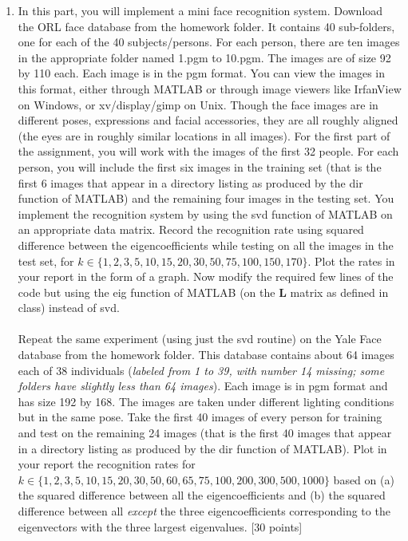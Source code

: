 \documentclass[11pt]{article}
\begin{document}
\begin{enumerate}
\item In this part, you will implement a mini face recognition system. Download the ORL face database from the homework folder. It contains 40 sub-folders, one for each of the 40 subjects/persons. For each person, there are ten images in the appropriate folder named 1.pgm to 10.pgm. The images are of size 92 by 110 each. Each image is in the pgm format. You can view the images in this format, either through MATLAB or through image viewers like IrfanView on Windows, or xv/display/gimp on Unix. Though the face images are in different poses, expressions and facial accessories, they are all roughly aligned (the eyes are in roughly similar locations in all images). For the first part of the assignment, you will work with the images of the first 32 people. For each person, you will include the first six images in the training set (that is the first 6 images that appear in a directory listing as produced by the \textsf{dir} function of MATLAB) and the remaining four images in the testing set. You implement the recognition system by using the \textsf{svd} function of MATLAB on an appropriate data matrix. Record the recognition rate using squared difference between the eigencoefficients while testing on all the images in the test set, for $k \in \{1,2,3,5,10,15,20,30,50,75,100,150,170\}$. Plot the rates in your report in the form of a graph. Now modify the required few lines of the code but using the \textsf{eig} function of MATLAB (on the $\boldsymbol{L}$ matrix as defined in class) instead of \textsf{svd}.
\\
\\
Repeat the same experiment (using just the \textsf{svd} routine) on the Yale Face database from the homework folder. This database contains about 64 images each of 38 individuals (\textit{labeled from 1 to 39, with number 14 missing; some folders have slightly less than 64 images}). Each image is in pgm format and has size 192 by 168. The images are taken under different lighting conditions but in the same pose. Take the first 40 images of every person for training and test on the remaining 24 images (that is the first 40 images that appear in a directory listing as produced by the dir function of MATLAB). Plot in your report the recognition rates for $k \in \{1,2,3,5,10,15,20,30,50,60, 65,75,100,200,300,500,1000\}$ based on (a) the squared difference between all the eigencoefficients and (b) the squared difference between all \emph{except} the three eigencoefficients corresponding to the eigenvectors with the three largest eigenvalues. \textsf{[30 points]}


\end{enumerate}
\end{document}
